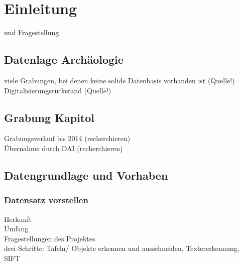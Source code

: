 \section{Einleitung}

\Einleitung und Fragestellung\\

\subsection{Datenlage Archäologie}
viele Grabungen, bei denen keine solide Datenbasis vorhanden ist (Quelle!)\\
Digitalisierungsrückstand (Quelle!)\\

\subsection{Grabung Kapitol}
Grabungsverlauf bis 2014 (recherchieren)\\
Übernahme durch DAI (recherchieren)\\

\subsection{Datengrundlage und Vorhaben}
\subsubsection{Datensatz vorstellen}
Herkunft\\
Umfang\\
Fragestellungen des Projektes\\

drei Schritte: Tafeln/ Objekte erkennen und ausschneiden, Textererkennung, SIFT\\

